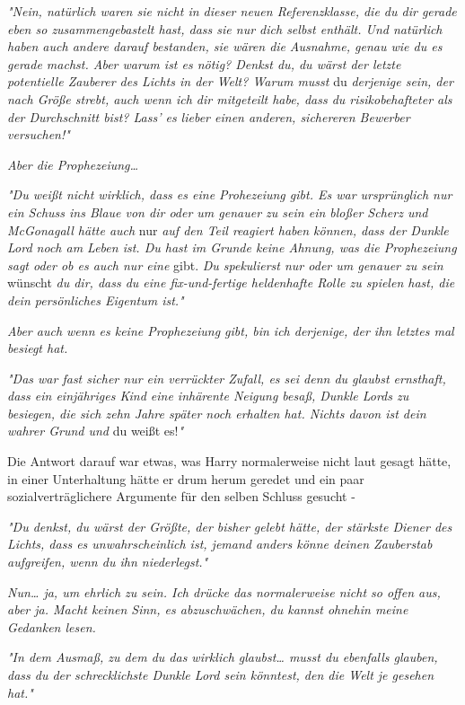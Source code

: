 {\emph{"Nein, natürlich waren sie nicht in dieser neuen Referenzklasse, die du dir gerade eben so zusammengebastelt hast, dass sie nur dich selbst enthält. Und natürlich haben auch andere darauf bestanden, sie wären die} \emph{Ausnahme, genau wie du es gerade machst. Aber warum ist es nötig? Denkst du, du wärst der letzte potentielle Zauberer des Lichts in der Welt? Warum musst} du \emph{derjenige sein, der nach Größe strebt, auch wenn ich dir mitgeteilt habe, dass du risikobehafteter als der Durchschnitt bist? Lass' es lieber einen anderen, sichereren Bewerber versuchen!"}

\emph{Aber die Prophezeiung…}

\emph{"Du weißt nicht wirklich, dass es eine Prohezeiung gibt. Es war ursprünglich nur ein Schuss ins Blaue von dir oder um genauer zu sein ein bloßer Scherz und McGonagall hätte auch} nur \emph{auf den Teil reagiert haben können, dass der Dunkle Lord noch am Leben ist. Du hast im Grunde keine Ahnung, was die Prophezeiung sagt oder ob es auch nur eine} gibt. \emph{Du spekulierst nur oder um genauer zu sein} wünscht \emph{du dir, dass du eine fix-und-fertige heldenhafte Rolle zu spielen hast, die dein persönliches Eigentum ist."}

\emph{Aber auch wenn es keine Prophezeiung gibt, bin ich derjenige, der ihn letztes mal besiegt hat.}

\emph{"Das war fast sicher nur ein verrückter Zufall, es sei denn du glaubst ernsthaft, dass ein einjähriges Kind eine inhärente Neigung besaß, Dunkle Lords zu besiegen, die sich zehn Jahre später noch erhalten hat. Nichts davon ist dein wahrer Grund und} du weißt es!\emph{"}

Die Antwort darauf war etwas, was Harry normalerweise nicht laut gesagt hätte, in einer Unterhaltung hätte er drum herum geredet und ein paar sozialverträglichere Argumente für den selben Schluss gesucht -

\emph{"Du denkst, du wärst der Größte, der bisher gelebt hätte, der stärkste Diener des Lichts, dass es unwahrscheinlich ist, jemand anders könne deinen Zauberstab aufgreifen, wenn du ihn niederlegst."}

\emph{Nun… ja, um ehrlich zu sein. Ich drücke das normalerweise nicht so offen aus, aber ja. Macht keinen Sinn, es abzuschwächen, du kannst ohnehin meine Gedanken lesen.}

\emph{"In dem Ausmaß, zu dem du das wirklich glaubst… musst du ebenfalls glauben, dass du der schrecklichste Dunkle Lord sein könntest, den die Welt je gesehen hat."}

}
